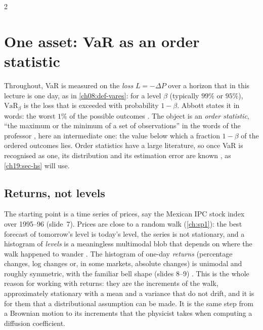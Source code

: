 \begin{paracol}{2}
\section{One asset: VaR as an order statistic}\label{ch19:sec-one}
Throughout, VaR is measured on the \emph{loss} $L=-\Delta P$ over a horizon that in this lecture is one day, as in \cref{ch08:def-vares}: for a level $\beta$ (typically $99\%$ or $95\%$), $\mathrm{VaR}_\beta$ is the loss that is exceeded with probability $1-\beta$.
Abbott states it in words: the worst $1\%$ of the possible outcomes . The object is an \emph{order statistic}, ``the maximum or the minimum of a set of observations'' in the words of the professor , here an intermediate one: the value below which a fraction $1-\beta$ of the ordered outcomes lies. Order statistics have a large literature, so once VaR is recognised as one, its distribution and its estimation error are known , as \cref{ch19:sec-hs} will use.

\subsection{Returns, not levels}
The starting point is a time series of prices, say the Mexican IPC stock index over 1995--96 (slide~7). Prices are close to a random walk (\cref{ch:sp1}): the best forecast of tomorrow's level is today's level, the series is not stationary, and a histogram of \emph{levels} is a meaningless multimodal blob that depends on where the walk happened to wander . The histogram of one-day \emph{returns} (percentage changes, log changes or, in some markets, absolute changes) is unimodal and roughly symmetric, with the familiar bell shape (slides 8--9) . This is the whole reason for working with returns: they are the increments of the walk, approximately stationary with a mean and a variance that do not drift, and it is for them that a distributional assumption can be made. It is the same step from a Brownian motion to its increments that the physicist takes when computing a diffusion coefficient.


\end{paracol}
